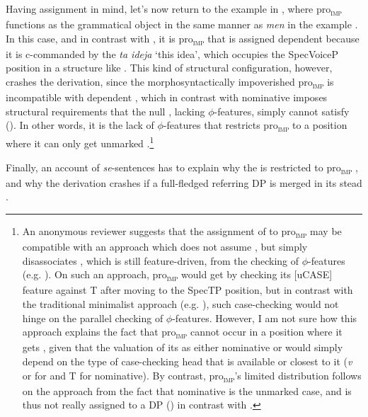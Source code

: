 \documentclass[output=paper,nonflat,newtxmath]{langsci/langscibook}
\begin{document}
 Having  assignment in mind, let's now return to the  example in , where pro\textsubscript{\textsc{imp}} functions as the grammatical object in the same manner as \textit{men} in the  example . In this case, and in contrast with , it is pro\textsubscript{\textsc{imp}} that is assigned dependent  because it is c-commanded by the  \textit{ta ideja} `this idea', which occupies the SpecVoiceP position in a structure like . This kind of structural configuration, however, crashes the derivation, since the morphosyntactically impoverished pro\textsubscript{\textsc{imp}} is incompatible with dependent , which in contrast with nominative imposes structural requirements that the null , lacking $\phi$-features, simply cannot satisfy (\citealt{Fenger2017}). In other words, it is the lack of $\phi$-features that restricts pro\textsubscript{\textsc{imp}} to a position where it can only get unmarked .\footnote{An anonymous reviewer suggests that the assignment of  to pro\textsubscript{\textsc{imp}} may be compatible with an approach which does not assume , but simply disassociates , which is still feature-driven, from the checking of $\phi$-features (e.g. \citealt{boskovic2007local}). On such an approach, pro\textsubscript{\textsc{imp}} would get  by checking its [uCASE] feature against T  after moving to the SpecTP position, but in contrast with the traditional minimalist approach (e.g. \citealt{chomsky2001}), such case-checking would not hinge on the parallel checking of $\phi$-features. However, I am not sure how this approach explains the fact that pro\textsubscript{\textsc{imp}} cannot occur in a position where it gets , given that the valuation of its  as either nominative or  would simply depend on the type of case-checking head that is available or closest to it (\textit{v} or  for  and T for nominative). By contrast, pro\textsubscript{\textsc{imp}}'s limited distribution follows on the  approach from the fact that nominative is the unmarked case, and is thus not really assigned to a DP (\citealt{kornfilt2015}) in contrast with .}

Finally, an account of  \textit{se}-sentences has to explain why the  is restricted to pro\textsubscript{\textsc{imp}} , and why the derivation crashes if a full-fledged referring DP is merged in its stead .
\end{document}
